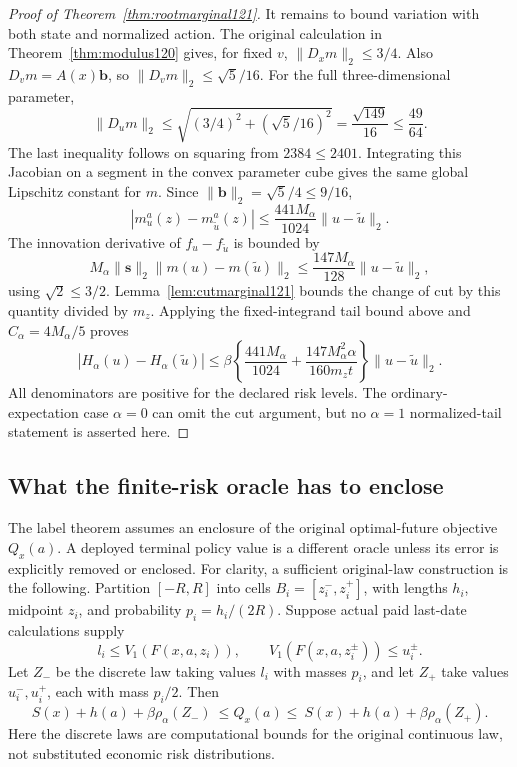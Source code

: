 \begin{proof}[Proof of Theorem~\ref{thm:rootmarginal121}]
It remains to bound variation with both state and normalized
action.  The original calculation in
Theorem~\ref{thm:modulus120} gives, for fixed \(v\),
\(\|D_xm\|_2\leq3/4\).
Also \(D_vm=A(x)\boldsymbol b\), so
\(\|D_vm\|_2\leq\sqrt5/16\).
For the full three-dimensional parameter,
\[
 \|D_um\|_2\leq
       \sqrt{(3/4)^2+(\sqrt5/16)^2}
       =\frac{\sqrt{149}}{16}\leq\frac{49}{64}.
\]
The last inequality follows on squaring from
\(2384\leq2401\).  Integrating this Jacobian on a segment
in the convex parameter cube gives the same global
Lipschitz constant for \(m\).
Since \(\|\boldsymbol b\|_2=\sqrt5/4\leq9/16\),
\[
 |m_u^a(z)-m_{\widetilde u}^a(z)|
 \leq\frac{441M_\alpha}{1024}\|u-\widetilde u\|_2.
\]
The innovation derivative of \(f_u-f_{\widetilde u}\) is
bounded by
\[
 M_\alpha\|\boldsymbol s\|_2
             \|m(u)-m(\widetilde u)\|_2
 \leq\frac{147M_\alpha}{128}\|u-\widetilde u\|_2,
\]
using \(\sqrt2\leq3/2\).
Lemma~\ref{lem:cutmarginal121} bounds the change of cut by
this quantity divided by \(m_z\).  Applying the fixed-integrand
tail bound above and \(C_\alpha=4M_\alpha/5\) proves
\[
 |H_\alpha(u)-H_\alpha(\widetilde u)|
 \leq\beta\left\{\frac{441M_\alpha}{1024}
       +\frac{147M_\alpha^2\alpha}{160m_zt}\right\}
                 \|u-\widetilde u\|_2.
\]
All denominators are positive for the declared risk levels.
The ordinary-expectation case \(\alpha=0\) can omit the cut
argument, but no \(\alpha=1\) normalized-tail statement is
asserted here.
\end{proof}

\subsection{What the finite-risk oracle has to enclose}

The label theorem assumes an enclosure of the original
optimal-future objective \(Q_x(a)\).  A deployed terminal
policy value is a different oracle unless its error is
explicitly removed or enclosed.  For clarity, a sufficient
original-law construction is the following.  Partition
\([-R,R]\) into cells \(B_i=[z_i^-,z_i^+]\), with lengths
\(h_i\), midpoint \(z_i\), and probability \(p_i=h_i/(2R)\).
Suppose actual paid last-date calculations supply
\[
 l_i\leq V_1(F(x,a,z_i)),\qquad
 V_1(F(x,a,z_i^\pm))\leq u_i^\pm.
\]
Let \(Z_-\) be the discrete law taking values \(l_i\)
with masses \(p_i\), and let \(Z_+\) take values
\(u_i^-,u_i^+\), each with mass \(p_i/2\).
Then
\begin{equation}\label{eq:labelrisk121}
 S(x)+h(a)+\beta\rho_\alpha(Z_-)
 \ \leq Q_x(a)\leq\
 S(x)+h(a)+\beta\rho_\alpha(Z_+).
\end{equation}
Here the discrete laws are computational bounds for the original
continuous law, not substituted economic risk distributions.

